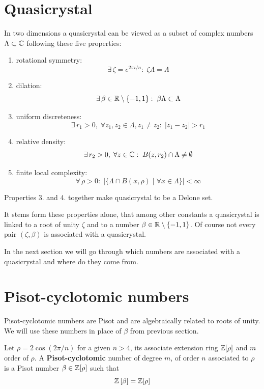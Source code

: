 \documentclass[text.tex]{subfiles}
\begin{document}
\section{Quasicrystal}\label{sec_quasicrystalEaseIn}%
In two dimensions a quasicrystal can be viewed as a subset of complex numbers $\Lambda\subset\mathbb{C}$ following these five properties:

\begin{enumerate}
\item rotational symmetry: $$\exists\,\zeta = e^{2\pi i/n}:\; \zeta\Lambda = \Lambda$$
\item dilation: $$\exists\,\beta\in\mathbb{R}\setminus\{-1,1\}:\; \beta\Lambda\subset \Lambda$$
\item uniform discreteness: $$\exists\,r_1>0,\; \forall z_1,z_2\in\Lambda, z_1\neq z_2:\; |z_1-z_2|>r_1$$
\item relative density: $$\exists\,r_2>0,\; \forall z\in\mathbb{C}:\; B(z,r_2)\cap\Lambda \neq \emptyset$$
\item finite local complexity: $$\forall\,\rho>0:\;\big|\{\Lambda\cap B(x,\rho)\;|\;\forall x\in\Lambda\}\big| < \infty$$
\end{enumerate}

\begin{remark}
Properties 3. and 4. together make quasicrystal to be a Delone set.
\end{remark}

It stems form these properties alone, that among other constants a quasicrystal is linked to a root of unity $\zeta$ and to a number $\beta\in\mathbb{R}\setminus\{-1,1\}$. Of course not every pair $(\zeta, \beta)$ is associated with a quasicrystal.

In the next section we will go through which numbers are associated with a quasicrystal and where do they come from. 

\section{Pisot-cyclotomic numbers}\label{sec_pisotCyclotomic}%
Pisot-cyclotomic numbers are Pisot and are algebraically related to roots of unity. We will use these numbers in place of $\beta$ from previous section. 

\begin{definition}\label{def_pisotCyclotomic}
Let $\rho = 2\cos\left(2\pi/n\right)$ for a given $n>4$, its associate extension ring $\mathbb{Z}[\rho]$ and $m$ order of $\rho$. A \textbf{Pisot-cyclotomic} number of degree $m$, of order $n$ associated to $\rho$ is a Pisot number $\beta \in \mathbb{Z}[\rho]$ such that
$$\mathbb{Z}\left[\beta\right] = \mathbb{Z}[\rho]$$
\end{definition}
\end{document}
